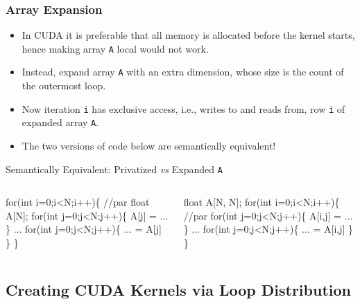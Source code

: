 \documentclass{beamer}
\newcommand{\emp}[1]{\textcolor{DikuRed}{ #1}}
\newcommand{\emphh}[1]{\textcolor{CosGreen}{ #1}}
\begin{document}
\begin{frame}[fragile,t]
  \frametitle{Array Expansion} %


\begin{itemize}
\item In CUDA it is preferable that all memory is allocated
        before the kernel starts, hence making array {\tt A}
        local would not work.\smallskip

\item Instead, expand array {\tt A} with an extra dimension,
        whose size is the count of the outermost loop. 

\item Now iteration {\tt i} has exclusive access, i.e., writes to and 
        reads from,  row {\tt i} of expanded array {\tt A}.

\item The two versions of code below are \emp{semantically equivalent!}
\end{itemize}

\begin{block}{Semantically Equivalent: Privatized {\em vs} Expanded {\tt A}}
\begin{columns}
\begin{colorcode}
\emphh{for(int i=0;i<N;i++)\{ //par}
  \emp{float A[N];}
  for(int j=0;j<N;j++)\{
    \emp{A[j]} = ...
  \}
  ...
  for(int j=0;j<N;j++)\{
    ... = \emp{A[j]}
  \}  
\}
\end{colorcode}
\begin{colorcode}
\emphh{float A[N, N];}
\emphh{for(int i=0;i<N;i++)\{ //par}
  for(int j=0;j<N;j++)\{
    \emphh{A[i,j]} = ...
  \}
  ...
  for(int j=0;j<N;j++)\{
    ... = \emphh{A[i,j]}
  \}  
\}
\end{colorcode}
\end{columns}
\end{block} 

\end{frame}


\subsection{Creating CUDA Kernels via Loop Distribution}
\end{document}
